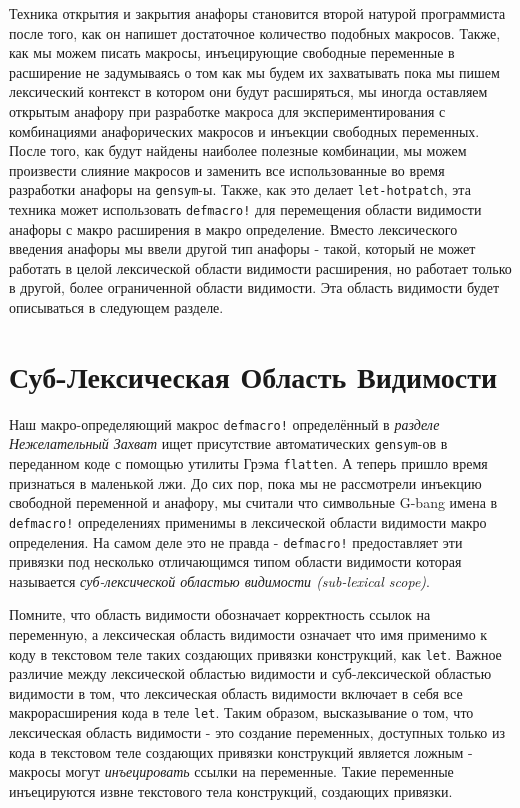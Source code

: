 Техника открытия и закрытия анафоры становится второй натурой программиста после того, как он напишет достаточное количество подобных макросов. Также, как мы можем писать макросы, инъецирующие свободные переменные в расширение не задумываясь о том как мы будем их захватывать пока мы пишем лексический контекст в котором они будут расширяться, мы иногда оставляем открытым анафору при разработке макроса для экспериментирования с комбинациями анафорических макросов и инъекции свободных переменных. После того, как будут найдены наиболее полезные комбинации, мы можем произвести слияние макросов и заменить все использованные во время разработки анафоры на \verb"gensym"-ы. Также, как это делает \verb"let-hotpatch", эта техника может использовать \verb"defmacro!" для перемещения области видимости анафоры с макро расширения в макро определение. Вместо лексического введения анафоры мы ввели другой тип анафоры - такой, который не может работать в целой лексической области видимости расширения, но работает только в другой, более ограниченной области видимости. Эта область видимости будет описываться в следующем разделе.

\section{Суб-Лексическая Область Видимости}\label{section_sub-lexical_scope}


Наш макро-определяющий макрос \verb"defmacro!" определённый в \emph{разделе Нежелательный Захват} ищет присутствие автоматических \verb"gensym"-ов в переданном коде с помощью утилиты Грэма \verb"flatten". А теперь пришло время признаться в маленькой лжи. До сих пор, пока мы не рассмотрели инъекцию свободной переменной и анафору, мы считали что символьные G-bang имена в \verb"defmacro!" определениях применимы в лексической области видимости макро определения. На самом деле это не правда - \verb"defmacro!" предоставляет эти привязки под несколько отличающимся типом области видимости которая называется \emph{суб-лексической областью видимости (sub-lexical scope)}.

Помните, что область видимости обозначает корректность ссылок на переменную, а лексическая область видимости означает что имя применимо к коду в текстовом теле таких создающих привязки конструкций, как \verb"let". Важное различие между лексической областью видимости и суб-лексической областью видимости в том, что лексическая область видимости включает в себя все макрорасширения кода в теле \verb"let". Таким образом, высказывание о том, что лексическая область видимости - это создание переменных, доступных только из кода в текстовом теле создающих привязки конструкций является ложным - макросы могут \emph{инъецировать} ссылки на переменные. Такие переменные инъецируются извне текстового тела конструкций, создающих привязки.

